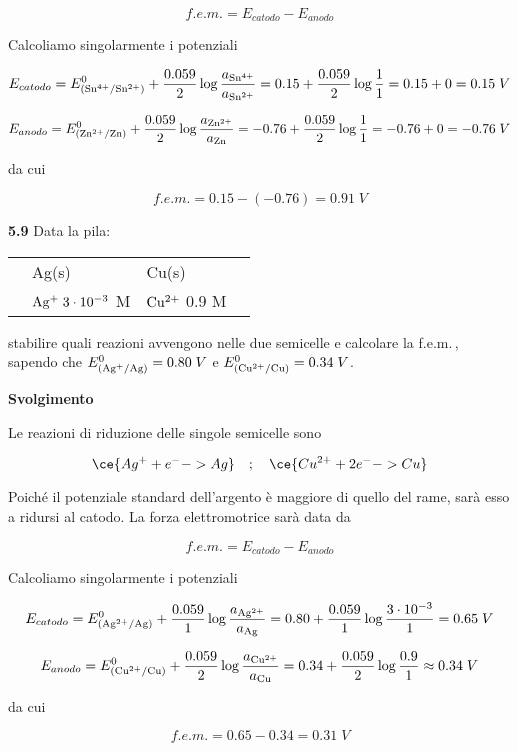 $$f.e.m. = E_{catodo} - E_{anodo}$$

Calcoliamo singolarmente i potenziali

$$E_{catodo}
=E^0_{(\rm Sn^{4+}/Sn^{2+})} + \frac{0.059}{2} \log \frac{a_{\rm Sn^{4+}}}{a_{\rm Sn^{2+}}}
=0.15 + \frac{0.059}{2} \log \frac{1}{1}
=0.15 + 0 = 0.15\;V$$

$$E_{anodo} = E^0_{(\rm Zn^{2+}/Zn)} + \frac{0.059}{2} \log \frac{a_{\rm Zn^{2+}}}{a_{\rm Zn}}
=-0.76 + \frac{0.059}{2} \log \frac{1}{1}
= -0.76 + 0=-0.76\;V$$

da cui

$$f.e.m.=0.15 - (-0.76) = 0.91\;V$$

\vspace{0.2cm}\textbf{5.9} Data la pila:

\begin{center}
    \begin{tabular}{p{0.6cm}|p{3cm}||p{3cm}|p{1cm}}
        & Ag(s) & Cu(s) & \\[0.5ex]
        & $\rm Ag^{+}\;3 \cdot 10^{-3}$ M & $\rm Cu^{2+}$ 0.9 M&\\[0.5ex]
    \end{tabular}
\end{center}

stabilire quali reazioni avvengono nelle due semicelle e calcolare la f.e.m.\,, sapendo che $E^0_{(\rm Ag^{+}/Ag)}=0.80\;V$ e $E^0_{(\rm Cu^{2+}/Cu)}=0.34\;V$.

\vspace{0.2cm}\large\textbf{Svolgimento}\normalsize

\vspace{0.2cm}Le reazioni di riduzione delle singole semicelle sono

$$\ce{Ag^{+} + e^- -> Ag}
\quad;\quad
\ce{Cu^{2+} + 2 e^- -> Cu}$$

Poiché il potenziale standard dell'argento è maggiore di quello del rame, sarà esso a ridursi al catodo. La forza elettromotrice sarà data da

$$f.e.m. = E_{catodo} - E_{anodo}$$

Calcoliamo singolarmente i potenziali

$$E_{catodo}
=E^0_{(\rm Ag^{2+}/Ag)} + \frac{0.059}{1} \log \frac{a_{\rm Ag^{2+}}}{a_{\rm Ag}}
=0.80 + \frac{0.059}{1} \log \frac{3 \cdot 10^{-3}}{1}
=0.65\;V$$

$$E_{anodo} = E^0_{(\rm Cu^{2+}/Cu)} + \frac{0.059}{2} \log \frac{a_{\rm Cu^{2+}}}{a_{\rm Cu}}
=0.34 + \frac{0.059}{2} \log \frac{0.9}{1}
\approx 0.34\;V$$

da cui

$$f.e.m.=0.65 - 0.34 = 0.31\;V$$

